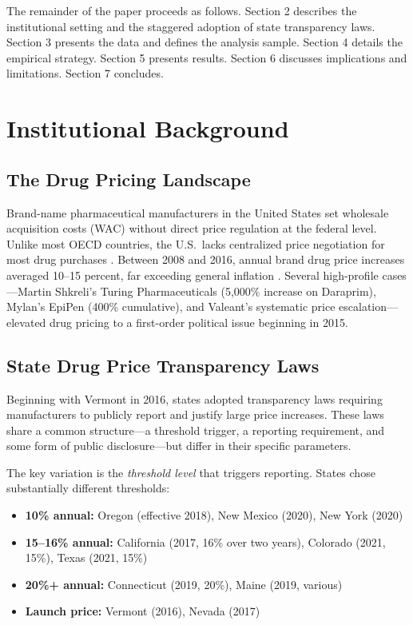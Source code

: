 \documentclass[12pt]{article}
\begin{document}
The remainder of the paper proceeds as follows. Section 2 describes the institutional setting and the staggered adoption of state transparency laws. Section 3 presents the data and defines the analysis sample. Section 4 details the empirical strategy. Section 5 presents results. Section 6 discusses implications and limitations. Section 7 concludes.


\section{Institutional Background}

\subsection{The Drug Pricing Landscape}

Brand-name pharmaceutical manufacturers in the United States set wholesale acquisition costs (WAC) without direct price regulation at the federal level. Unlike most OECD countries, the U.S.\ lacks centralized price negotiation for most drug purchases \citep{lakdawalla2018}. Between 2008 and 2016, annual brand drug price increases averaged 10--15 percent, far exceeding general inflation \citep{scherer1993, dusetzina2022}. Several high-profile cases---Martin Shkreli's Turing Pharmaceuticals (5,000\% increase on Daraprim), Mylan's EpiPen (400\% cumulative), and Valeant's systematic price escalation---elevated drug pricing to a first-order political issue beginning in 2015.

\subsection{State Drug Price Transparency Laws}

Beginning with Vermont in 2016, states adopted transparency laws requiring manufacturers to publicly report and justify large price increases. These laws share a common structure---a threshold trigger, a reporting requirement, and some form of public disclosure---but differ in their specific parameters.

The key variation is the \textit{threshold level} that triggers reporting. States chose substantially different thresholds:

\begin{itemize}
\item \textbf{10\% annual:} Oregon (effective 2018), New Mexico (2020), New York (2020)
\item \textbf{15--16\% annual:} California (2017, 16\% over two years), Colorado (2021, 15\%), Texas (2021, 15\%)
\item \textbf{20\%+ annual:} Connecticut (2019, 20\%), Maine (2019, various)
\item \textbf{Launch price:} Vermont (2016), Nevada (2017)
\end{itemize}
\end{document}
